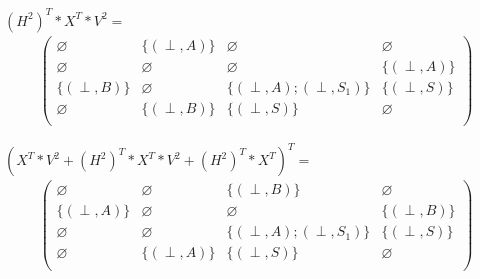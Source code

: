 
$(H^2)^T * X^T * V^2 =$
\begin{align*}
\begin{pmatrix}
      \varnothing            & \{ (\perp,A) \}            & \varnothing            & \varnothing            \\
      \varnothing        & \varnothing            & \varnothing                & \{ (\perp,A) \}            \\
      \{ (\perp,B) \}            & \varnothing            & \{ (\perp,A);(\perp,S_1) \}            & \{ (\perp,S) \}     \\
      \varnothing            & \{ (\perp,B) \}            & \{ (\perp,S) \}      & \varnothing  \\
\end{pmatrix}
\end{align*}


$(X^T *V^2 + (H^2)^T * X^T  * V^2 + (H^2)^T * X^T)^T=$
\begin{align*}
\begin{pmatrix}
      \varnothing            & \varnothing            & \{ (\perp,B) \}            & \varnothing            \\
      \{ (\perp,A) \}        & \varnothing            & \varnothing                & \{ (\perp,B) \}    \\
      \varnothing            & \varnothing            & \{ (\perp,A);(\perp,S_1) \}            & \{ (\perp,S) \}     \\
      \varnothing            & \{ (\perp,A) \}        & \{ (\perp,S) \}      & \varnothing  \\
\end{pmatrix}
\end{align*}



